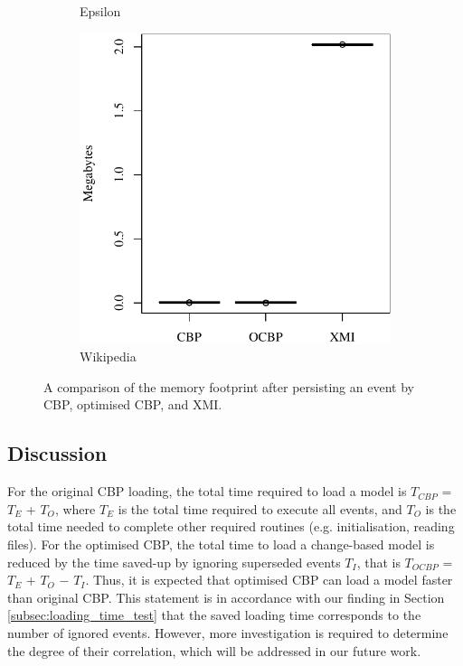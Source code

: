 {\begin{figure}[ht]
\begin{subfigure}{0.325\textwidth}
      \caption{Epsilon}
      \label{fig:save_memory_epsilon}
    \end{subfigure}
    \hfill
    \begin{subfigure}{0.325\textwidth}
      \centering
      \includegraphics[width=\linewidth]{images/ol_save_memory_wikipedia}
      \caption{Wikipedia}
      \label{fig:save_memory_wikipedia}
    \end{subfigure}
    \caption{A comparison of the memory footprint after persisting an event by CBP, optimised CBP, and XMI.}
    \label{fig:savememory}
  \end{figure}
  
  \subsection{Discussion}
  \label{sec:discussion}
  For the original CBP loading, the total time required to load a model is $T_{CBP}$ = $T_E$ + $T_O$, where $T_E$ is the total time required to execute all events, and $T_O$ is the total time needed to complete other required routines (e.g. initialisation, reading files). For the optimised CBP, the total time to load a change-based model is reduced by the time saved-up by ignoring superseded events $T_I$, that is $T_{OCBP}$ = $T_E$ + $T_O$ $-$ $T_I$. Thus, it is expected that optimised CBP can load a model faster than original CBP. This statement is in accordance with our finding in Section \ref{subsec:loading_time_test} that the saved loading time corresponds to the number of ignored events. However, more investigation is required to determine the degree of their correlation, which will be addressed in our future work.
  
}
